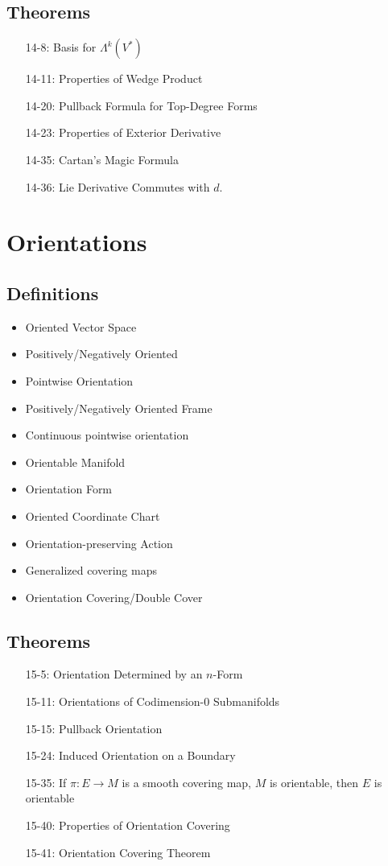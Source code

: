 \documentclass[11.5pt]{scrartcl}
\newcommand{\<}{\langle}
\renewcommand{\>}{\rangle}
\begin{document}
\subsection{Theorems}
\begin{itemize}
\item[14-8:] Basis for $\Lambda^k(V^*)$
\item[14-11:] Properties of Wedge Product
\item[14-20:] Pullback Formula for Top-Degree Forms
\item[14-23:] Properties of Exterior Derivative
\item[14-35:] Cartan's Magic Formula
\item[14-36:] Lie Derivative Commutes with $d$.
\end{itemize}
\section{Orientations}
\subsection{Definitions}
\begin{itemize}
\item  Oriented Vector Space
\item Positively/Negatively Oriented
\item Pointwise Orientation
\item Positively/Negatively Oriented Frame
\item Continuous pointwise orientation
\item Orientable Manifold
\item Orientation Form
\item Oriented Coordinate Chart
\item Orientation-preserving Action
\item Generalized covering maps
\item Orientation Covering/Double Cover
\end{itemize}
\subsection{Theorems}
\begin{itemize}
\item[15-5:] Orientation Determined by an $n$-Form
\item[15-11:] Orientations of Codimension-0 Submanifolds
\item[15-15:] Pullback Orientation
\item[15-24:] Induced Orientation on a Boundary
\item[15-35:] If $\pi: E \to M$ is a smooth covering map, $M$ is orientable, then $E$ is orientable
\item [15-40:] Properties of Orientation Covering
\item[15-41:] Orientation Covering Theorem
\end{itemize}
\end{document}
